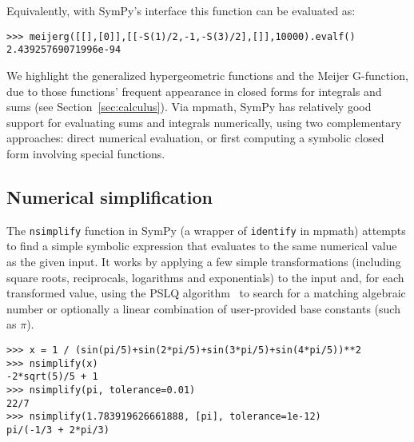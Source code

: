 Equivalently, with SymPy's interface this function can be evaluated as:
\begin{verbatim}
>>> meijerg([[],[0]],[[-S(1)/2,-1,-S(3)/2],[]],10000).evalf()
2.43925769071996e-94
\end{verbatim}

We highlight the generalized hypergeometric functions and the Meijer
G-function, due to those functions' frequent appearance in closed forms for
integrals and sums (see Section~\ref{sec:calculus}). Via mpmath, SymPy has
relatively good support for evaluating sums and integrals numerically, using
two complementary approaches: direct numerical evaluation, or first computing
a symbolic closed form involving special functions.

\subsection{Numerical simplification}

The \texttt{nsimplify} function in SymPy
(a wrapper of \texttt{identify} in mpmath)
attempts to find a simple symbolic
expression that evaluates to the same numerical value as the given
input.
It works by applying a few simple transformations
(including square roots, reciprocals, logarithms and exponentials) to
the input and, for each transformed value,
using the PSLQ algorithm~\cite{Ferguson1999} to search for
a matching algebraic number or optionally a linear combination
of user-provided base constants (such as $\pi$).

\begin{verbatim}
>>> x = 1 / (sin(pi/5)+sin(2*pi/5)+sin(3*pi/5)+sin(4*pi/5))**2
>>> nsimplify(x)
-2*sqrt(5)/5 + 1
>>> nsimplify(pi, tolerance=0.01)
22/7
>>> nsimplify(1.783919626661888, [pi], tolerance=1e-12)
pi/(-1/3 + 2*pi/3)
\end{verbatim}

